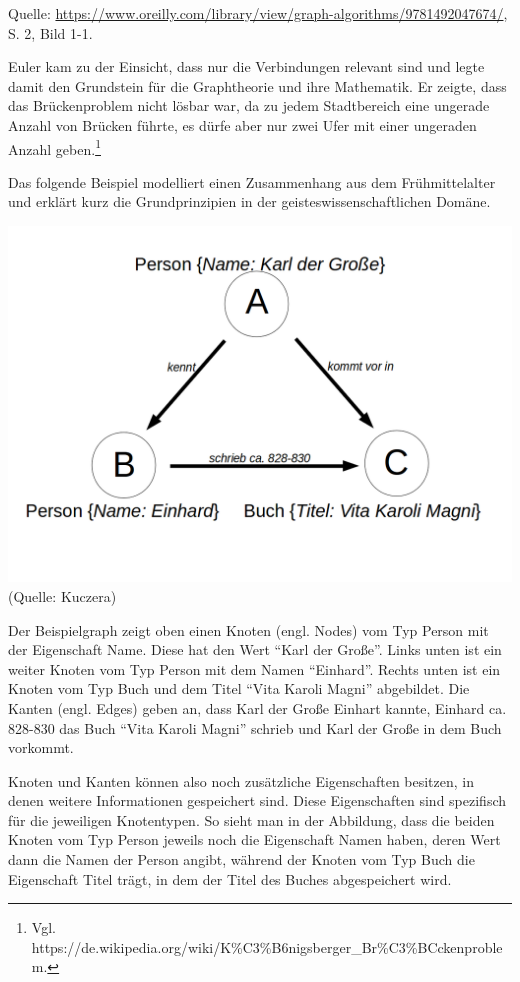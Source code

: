 \documentclass[ngerman,]{scrreprt}
\begin{document}
Quelle: \href{Needham/Hodler\%202019}{https://www.oreilly.com/library/view/graph-algorithms/9781492047674/}, S. 2, Bild 1-1.

Euler kam zu der Einsicht, dass nur die Verbindungen relevant sind und legte damit den Grundstein für die Graphtheorie und ihre Mathematik. Er zeigte, dass das Brückenproblem nicht lösbar war, da zu jedem Stadtbereich eine ungerade Anzahl von Brücken führte, es dürfe aber nur zwei Ufer mit einer ungeraden Anzahl geben.\footnote{Vgl. https://de.wikipedia.org/wiki/K\%C3\%B6nigsberger\_Br\%C3\%BCckenproblem.}

Das folgende Beispiel modelliert einen Zusammenhang aus dem Frühmittelalter und erklärt kurz die Grundprinzipien in der geisteswissenschaftlichen Domäne.

\includegraphics{Bilder/Beispielgraph.png} (Quelle: Kuczera)

Der Beispielgraph zeigt oben einen Knoten (engl. Nodes) vom Typ Person mit der Eigenschaft Name. Diese hat den Wert ``Karl der Große''. Links unten ist ein weiter Knoten vom Typ Person mit dem Namen ``Einhard''. Rechts unten ist ein Knoten vom Typ Buch und dem Titel ``Vita Karoli Magni'' abgebildet. Die Kanten (engl. Edges) geben an, dass Karl der Große Einhart kannte, Einhard ca. 828-830 das Buch ``Vita Karoli Magni'' schrieb und Karl der Große in dem Buch vorkommt.

Knoten und Kanten können also noch zusätzliche Eigenschaften besitzen, in denen weitere Informationen gespeichert sind. Diese Eigenschaften sind spezifisch für die jeweiligen Knotentypen. So sieht man in der Abbildung, dass die beiden Knoten vom Typ Person jeweils noch die Eigenschaft Namen haben, deren Wert dann die Namen der Person angibt, während der Knoten vom Typ Buch die Eigenschaft Titel trägt, in dem der Titel des Buches abgespeichert wird.
\end{document}
